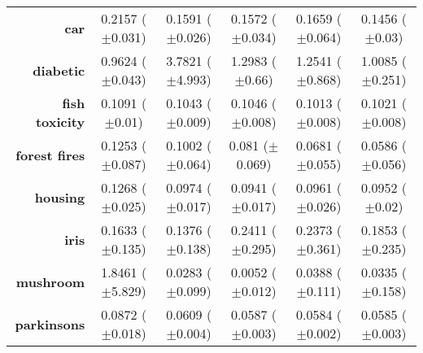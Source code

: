 \begin{table}[htb]
{\begin{tabular}{r|ccccc}
			\textbf{car}                 & \cellcolor[rgb]{ .973,  .412,  .42}0.2157 ($\pm$0.031)       & \cellcolor[rgb]{ 1,  .922,  .518}0.1591 ($\pm$0.026)    & \cellcolor[rgb]{ .91,  .894,  .51}0.1572 ($\pm$0.034)   & \cellcolor[rgb]{ 1,  .863,  .51}0.1659 ($\pm$0.064)     & \cellcolor[rgb]{ .388,  .745,  .482}0.1456 ($\pm$0.03)  \\
			\textbf{diabetic}            & \cellcolor[rgb]{ .388,  .745,  .482}0.9624 ($\pm$0.043)      & \cellcolor[rgb]{ .973,  .412,  .42}3.7821 ($\pm$4.993)  & \cellcolor[rgb]{ 1,  .914,  .518}1.2983 ($\pm$0.66)     & \cellcolor[rgb]{ 1,  .922,  .518}1.2541 ($\pm$0.868)    & \cellcolor[rgb]{ .482,  .773,  .486}1.0085 ($\pm$0.251) \\
			\textbf{fish toxicity}       & \cellcolor[rgb]{ .973,  .412,  .42}0.1091 ($\pm$0.01)        & \cellcolor[rgb]{ 1,  .922,  .518}0.1043 ($\pm$0.009)    & \cellcolor[rgb]{ 1,  .894,  .514}0.1046 ($\pm$0.008)    & \cellcolor[rgb]{ .388,  .745,  .482}0.1013 ($\pm$0.008) & \cellcolor[rgb]{ .549,  .792,  .49}0.1021 ($\pm$0.008)  \\
			\textbf{forest fires}        & \cellcolor[rgb]{ .973,  .412,  .42}0.1253 ($\pm$0.087)       & \cellcolor[rgb]{ .988,  .702,  .478}0.1002 ($\pm$0.064) & \cellcolor[rgb]{ 1,  .922,  .518}0.081 ($\pm$0.069)     & \cellcolor[rgb]{ .647,  .82,  .494}0.0681 ($\pm$0.055)  & \cellcolor[rgb]{ .388,  .745,  .482}0.0586 ($\pm$0.056) \\
			\textbf{housing}             & \cellcolor[rgb]{ .973,  .412,  .42}0.1268 ($\pm$0.025)       & \cellcolor[rgb]{ 1,  .902,  .514}0.0974 ($\pm$0.017)    & \cellcolor[rgb]{ .388,  .745,  .482}0.0941 ($\pm$0.017) & \cellcolor[rgb]{ 1,  .922,  .518}0.0961 ($\pm$0.026)    & \cellcolor[rgb]{ .729,  .843,  .502}0.0952 ($\pm$0.02)  \\
			\textbf{iris}                & \cellcolor[rgb]{ .714,  .839,  .498}0.1633 ($\pm$0.135)      & \cellcolor[rgb]{ .388,  .745,  .482}0.1376 ($\pm$0.138) & \cellcolor[rgb]{ .973,  .412,  .42}0.2411 ($\pm$0.295)  & \cellcolor[rgb]{ .976,  .447,  .427}0.2373 ($\pm$0.361) & \cellcolor[rgb]{ 1,  .922,  .518}0.1853 ($\pm$0.235)    \\
			\textbf{mushroom}            & \cellcolor[rgb]{ .973,  .412,  .42}1.8461 ($\pm$5.829)       & \cellcolor[rgb]{ .886,  .886,  .51}0.0283 ($\pm$0.099)  & \cellcolor[rgb]{ .388,  .745,  .482}0.0052 ($\pm$0.012) & \cellcolor[rgb]{ 1,  .922,  .518}0.0388 ($\pm$0.111)    & \cellcolor[rgb]{ 1,  .922,  .518}0.0335 ($\pm$0.158)    \\
			\textbf{parkinsons}          & \cellcolor[rgb]{ .973,  .412,  .42}0.0872 ($\pm$0.018)       & \cellcolor[rgb]{ 1,  .886,  .514}0.0609 ($\pm$0.004)    & \cellcolor[rgb]{ 1,  .922,  .518}0.0587 ($\pm$0.003)    & \cellcolor[rgb]{ .388,  .745,  .482}0.0584 ($\pm$0.002) & \cellcolor[rgb]{ .482,  .769,  .486}0.0585 ($\pm$0.003) \\

\end{tabular}}
\end{table}
